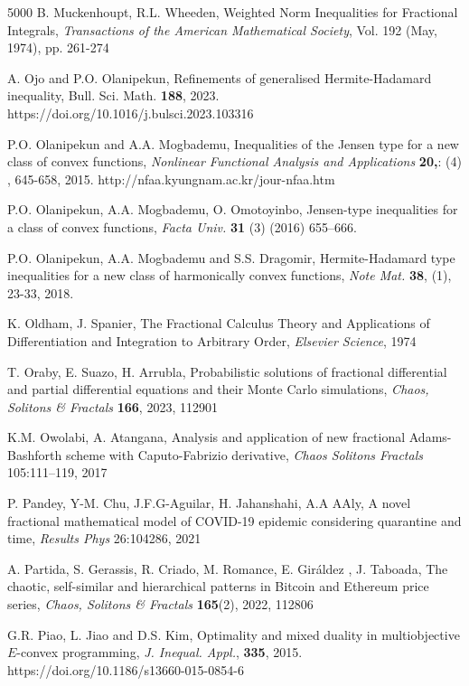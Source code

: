 \documentclass[10pt]{article}
\begin{document}
\begin{thebibliography}{5000}
 B. Muckenhoupt, R.L. Wheeden, Weighted Norm Inequalities for Fractional Integrals,
{\it Transactions of the American Mathematical Society}, Vol. 192 (May, 1974), pp. 261-274

 A. Ojo and P.O. Olanipekun, Refinements of generalised Hermite-Hadamard inequality, {Bull. Sci. Math.} {\bf 188}, 2023. https://doi.org/10.1016/j.bulsci.2023.103316 


 P.O. Olanipekun and A.A. Mogbademu, Inequalities of the Jensen type for a new class of convex functions, {\it Nonlinear Functional Analysis and Applications}
{\bf20,}: (4) , 645-658, 2015.
http://nfaa.kyungnam.ac.kr/jour-nfaa.htm

  P.O. Olanipekun, A.A. Mogbademu, O. Omotoyinbo, Jensen-type inequalities for a class of convex
functions, {\it Facta Univ.} {\bf31} (3) (2016) 655–666.

 P.O. Olanipekun, A.A. Mogbademu and S.S. Dragomir, Hermite-Hadamard type inequalities for a new class of harmonically convex functions, {\it Note Mat.} {\bf38}, (1), 23-33, 2018.

 K. Oldham, J. Spanier,  The Fractional Calculus Theory and Applications of Differentiation and Integration to Arbitrary Order, {\it Elsevier Science}, 1974


 T. Oraby, E. Suazo, H. Arrubla, Probabilistic solutions of fractional differential and partial differential equations and their Monte Carlo simulations, {\it Chaos, Solitons \& Fractals}
{\bf166},  2023, 112901


 K.M. Owolabi, A. Atangana,  Analysis and application of new fractional Adams-Bashforth scheme with Caputo-Fabrizio derivative, {\it Chaos Solitons Fractals} 105:111–119, 2017

 P. Pandey, Y-M. Chu, J.F.G-Aguilar, H. Jahanshahi, A.A AAly,  A novel fractional mathematical model of COVID-19 epidemic considering quarantine and time, {\it Results Phys} 26:104286, 2021  

 A. Partida, S. Gerassis, R. Criado, M. Romance, E. Giráldez , J. Taboada, The chaotic, self-similar and hierarchical patterns in Bitcoin and Ethereum price series, {\it Chaos, Solitons \& Fractals} {\bf 165}(2), 2022, 112806




 G.R. Piao, L. Jiao and D.S. Kim, Optimality and mixed duality in multiobjective $E$-convex programming, {\it J. Inequal. Appl.},  {\bf 335}, 2015. https://doi.org/10.1186/s13660-015-0854-6


\end{thebibliography}
\end{document}
